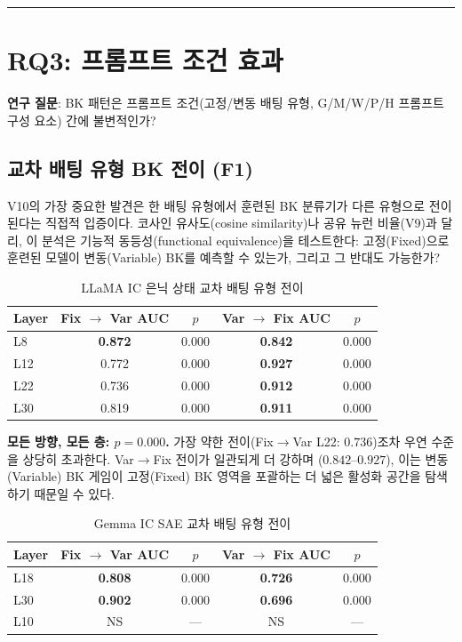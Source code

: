 \documentclass[11pt,a4paper]{article}
\begin{document}
\bigskip\hrule\bigskip

\section{RQ3: 프롬프트 조건 효과}

\noindent\textbf{연구 질문}: BK 패턴은 프롬프트 조건(고정/변동 배팅 유형, G/M/W/P/H 프롬프트 구성 요소) 간에 불변적인가?

\subsection{교차 배팅 유형 BK 전이 (F1)}

V10의 가장 중요한 발견은 한 배팅 유형에서 훈련된 BK 분류기가 다른 유형으로 전이된다는 직접적 입증이다. 코사인 유사도(cosine similarity)나 공유 뉴런 비율(V9)과 달리, 이 분석은 기능적 동등성(functional equivalence)을 테스트한다: 고정(Fixed)으로 훈련된 모델이 변동(Variable) BK를 예측할 수 있는가, 그리고 그 반대도 가능한가?

\begin{table}[H]
\centering
\caption{LLaMA IC 은닉 상태 교차 배팅 유형 전이}\label{tab:t13}
\footnotesize
\begin{tabular}{lcccc}
\toprule
Layer & Fix $\rightarrow$ Var AUC & $p$ & Var $\rightarrow$ Fix AUC & $p$ \\
\midrule
L8 & \textbf{0.872} & 0.000 & \textbf{0.842} & 0.000 \\
L12 & 0.772 & 0.000 & \textbf{0.927} & 0.000 \\
L22 & 0.736 & 0.000 & \textbf{0.912} & 0.000 \\
L30 & 0.819 & 0.000 & \textbf{0.911} & 0.000 \\
\bottomrule
\end{tabular}
\end{table}

\noindent\textbf{모든 방향, 모든 층: $p=0.000$.} 가장 약한 전이(Fix$\rightarrow$Var L22: $0.736$)조차 우연 수준을 상당히 초과한다. Var$\rightarrow$Fix 전이가 일관되게 더 강하며 ($0.842$--$0.927$), 이는 변동(Variable) BK 게임이 고정(Fixed) BK 영역을 포괄하는 더 넓은 활성화 공간을 탐색하기 때문일 수 있다.

\begin{table}[H]
\centering
\caption{Gemma IC SAE 교차 배팅 유형 전이}\label{tab:t14}
\footnotesize
\begin{tabular}{lcccc}
\toprule
Layer & Fix $\rightarrow$ Var AUC & $p$ & Var $\rightarrow$ Fix AUC & $p$ \\
\midrule
L18 & \textbf{0.808} & 0.000 & \textbf{0.726} & 0.000 \\
L30 & \textbf{0.902} & 0.000 & \textbf{0.696} & 0.000 \\
L10 & NS & --- & NS & --- \\
\bottomrule
\end{tabular}
\end{table}
\end{document}
